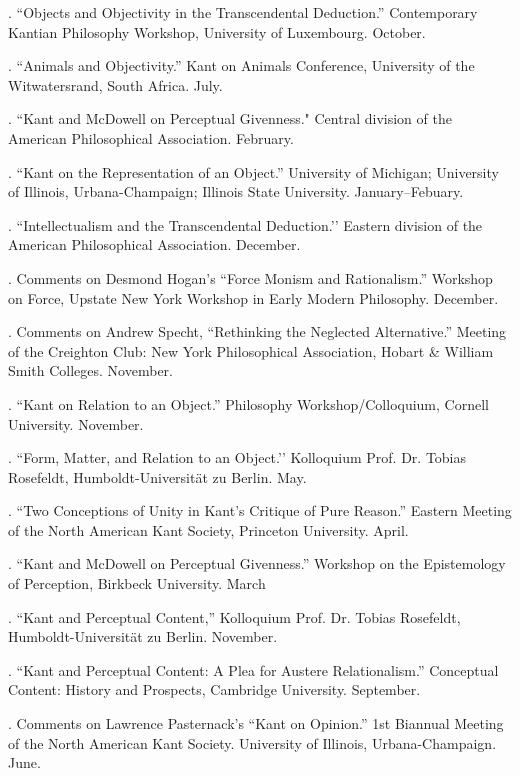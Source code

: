 \documentclass[11pt]{article}
\begin{document}
\newpage

\medskip

. ``Objects and Objectivity in the Transcendental Deduction.'' Contemporary Kantian Philosophy Workshop, University of Luxembourg. October.

. ``Animals and Objectivity.'' Kant on Animals Conference, University of the Witwatersrand, South Africa. July.

. ``Kant and McDowell on Perceptual Givenness." Central division of the American Philosophical Association. February.

. ``Kant on the Representation of an Object.'' University of Michigan; University of Illinois, Urbana-Champaign; Illinois State University. January--Febuary. 

. ``Intellectualism and the Transcendental Deduction.’’ Eastern division of the American Philosophical Association. December.

. Comments on Desmond Hogan's ``Force Monism and Rationalism.'' Workshop on Force, Upstate New York Workshop in Early Modern Philosophy. December. 

. Comments on Andrew Specht, ``Rethinking the Neglected Alternative.'' Meeting of the Creighton Club: New York Philosophical Association, Hobart \& William Smith Colleges. November.

. ``Kant on Relation to an Object.'' Philosophy Workshop/Colloquium, Cornell University. November.

. ``Form, Matter, and Relation to an Object.’’ Kolloquium Prof. Dr. Tobias Rosefeldt, Humboldt-Universität zu Berlin. May.

. ``Two Conceptions of Unity in Kant’s Critique of Pure Reason.” Eastern Meeting of the North American Kant Society, Princeton University. April.

. “Kant and McDowell on Perceptual Givenness.” Workshop on the Epistemology of Perception, Birkbeck University. March

. “Kant and Perceptual Content,” Kolloquium Prof. Dr. Tobias Rosefeldt, Humboldt-Universität zu Berlin. November.

. ``Kant and Perceptual Content: A Plea for Austere Relationalism.” Conceptual
Content: History and Prospects, Cambridge University. September.

. Comments on Lawrence Pasternack’s “Kant on Opinion.” 1st Biannual Meeting of the North American Kant Society. University of Illinois, Urbana-Champaign. June.
\end{document}
